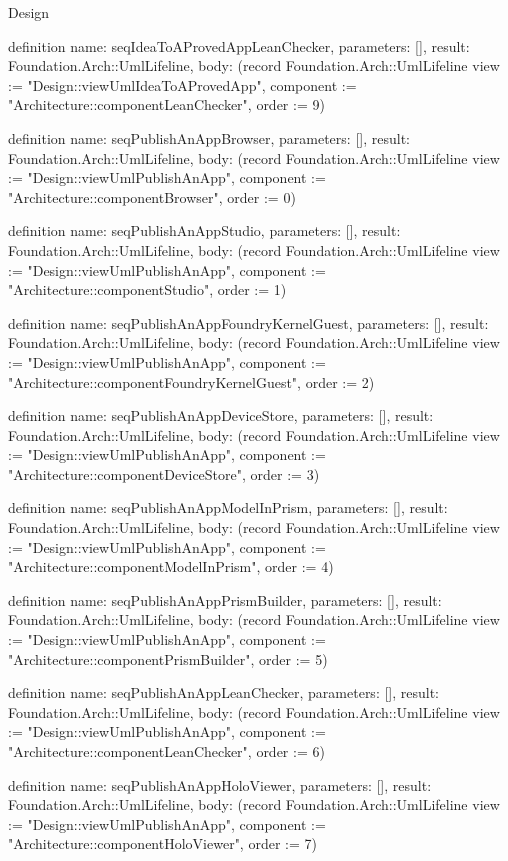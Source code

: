 \begin{lexlean}{Design}
\begin{semanticmodule}
definition{
  name: seqIdeaToAProvedAppLeanChecker,
  parameters: [],
  result: Foundation.Arch::UmlLifeline,
  body: (record Foundation.Arch::UmlLifeline {view := "Design::viewUmlIdeaToAProvedApp", component := "Architecture::componentLeanChecker", order := 9})
}

definition{
  name: seqPublishAnAppBrowser,
  parameters: [],
  result: Foundation.Arch::UmlLifeline,
  body: (record Foundation.Arch::UmlLifeline {view := "Design::viewUmlPublishAnApp", component := "Architecture::componentBrowser", order := 0})
}

definition{
  name: seqPublishAnAppStudio,
  parameters: [],
  result: Foundation.Arch::UmlLifeline,
  body: (record Foundation.Arch::UmlLifeline {view := "Design::viewUmlPublishAnApp", component := "Architecture::componentStudio", order := 1})
}

definition{
  name: seqPublishAnAppFoundryKernelGuest,
  parameters: [],
  result: Foundation.Arch::UmlLifeline,
  body: (record Foundation.Arch::UmlLifeline {view := "Design::viewUmlPublishAnApp", component := "Architecture::componentFoundryKernelGuest", order := 2})
}

definition{
  name: seqPublishAnAppDeviceStore,
  parameters: [],
  result: Foundation.Arch::UmlLifeline,
  body: (record Foundation.Arch::UmlLifeline {view := "Design::viewUmlPublishAnApp", component := "Architecture::componentDeviceStore", order := 3})
}

definition{
  name: seqPublishAnAppModelInPrism,
  parameters: [],
  result: Foundation.Arch::UmlLifeline,
  body: (record Foundation.Arch::UmlLifeline {view := "Design::viewUmlPublishAnApp", component := "Architecture::componentModelInPrism", order := 4})
}

definition{
  name: seqPublishAnAppPrismBuilder,
  parameters: [],
  result: Foundation.Arch::UmlLifeline,
  body: (record Foundation.Arch::UmlLifeline {view := "Design::viewUmlPublishAnApp", component := "Architecture::componentPrismBuilder", order := 5})
}

definition{
  name: seqPublishAnAppLeanChecker,
  parameters: [],
  result: Foundation.Arch::UmlLifeline,
  body: (record Foundation.Arch::UmlLifeline {view := "Design::viewUmlPublishAnApp", component := "Architecture::componentLeanChecker", order := 6})
}

definition{
  name: seqPublishAnAppHoloViewer,
  parameters: [],
  result: Foundation.Arch::UmlLifeline,
  body: (record Foundation.Arch::UmlLifeline {view := "Design::viewUmlPublishAnApp", component := "Architecture::componentHoloViewer", order := 7})
}


\end{semanticmodule}
\end{lexlean}
